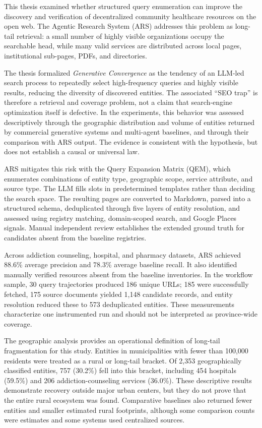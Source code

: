 \documentclass[12pt,oneside]{report}
\begin{document}
This thesis examined whether structured query enumeration can improve the discovery and verification of decentralized community healthcare resources on the open web. The Agentic Research System (ARS) addresses this problem as long-tail retrieval: a small number of highly visible organizations occupy the searchable head, while many valid services are distributed across local pages, institutional sub-pages, PDFs, and directories.

The thesis formalized \textit{Generative Convergence} as the tendency of an LLM-led search process to repeatedly select high-frequency queries and highly visible results, reducing the diversity of discovered entities. The associated ``SEO trap'' is therefore a retrieval and coverage problem, not a claim that search-engine optimization itself is defective. In the experiments, this behavior was assessed descriptively through the geographic distribution and volume of entities returned by commercial generative systems and multi-agent baselines, and through their comparison with ARS output. The evidence is consistent with the hypothesis, but does not establish a causal or universal law.

ARS mitigates this risk with the Query Expansion Matrix (QEM), which enumerates combinations of entity type, geographic scope, service attribute, and source type. The LLM fills slots in predetermined templates rather than deciding the search space. The resulting pages are converted to Markdown, parsed into a structured schema, deduplicated through five layers of entity resolution, and assessed using registry matching, domain-scoped search, and Google Places signals. Manual independent review establishes the extended ground truth for candidates absent from the baseline registries.

Across addiction counseling, hospital, and pharmacy datasets, ARS achieved 88.6\% average precision and 78.3\% average baseline recall. It also identified manually verified resources absent from the baseline inventories. In the workflow sample, 30 query trajectories produced 186 unique URLs; 185 were successfully fetched, 175 source documents yielded 1,148 candidate records, and entity resolution reduced these to 573 deduplicated entities. These measurements characterize one instrumented run and should not be interpreted as province-wide coverage.

The geographic analysis provides an operational definition of long-tail fragmentation for this study. Entities in municipalities with fewer than 100,000 residents were treated as a rural or long-tail bracket. Of 2,353 geographically classified entities, 757 (30.2\%) fell into this bracket, including 454 hospitals (59.5\%) and 206 addiction-counseling services (36.0\%). These descriptive results demonstrate recovery outside major urban centers, but they do not prove that the entire rural ecosystem was found. Comparative baselines also returned fewer entities and smaller estimated rural footprints, although some comparison counts were estimates and some systems used centralized sources.
\end{document}
